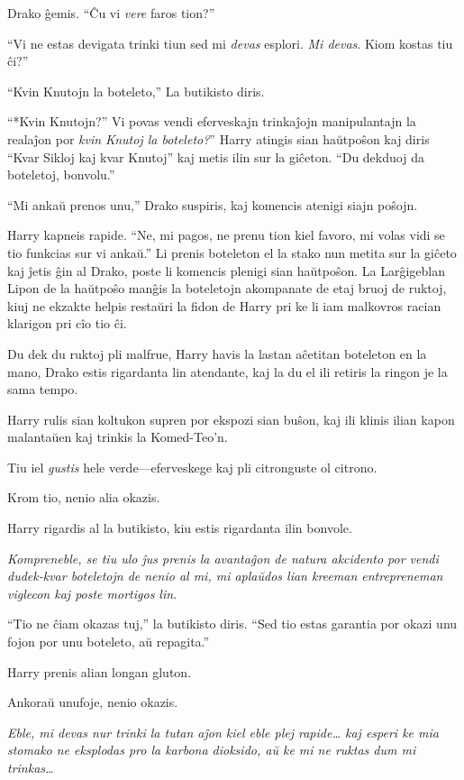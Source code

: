 Drako ĝemis. ``Ĉu vi \emph{vere} faros tion?''

``Vi ne estas devigata trinki tiun sed mi \emph{devas}
esplori. \emph{Mi devas}. Kiom kostas tiu ĉi?''

``Kvin Knutojn la boteleto,'' La butikisto diris.

``*Kvin Knutojn?'' Vi povas vendi eferveskajn trinkaĵojn manipulantajn la
realaĵon por \emph{kvin Knutoj la boteleto?}'' Harry atingis sian
haŭtpoŝon kaj diris ``Kvar Sikloj kaj kvar Knutoj'' kaj metis ilin sur la
giĉeton. ``Du dekduoj da boteletoj, bonvolu.'' 

``Mi ankaŭ prenos unu,'' Drako suspiris, kaj komencis atenigi siajn
poŝojn.

Harry kapneis rapide. ``Ne, mi pagos, ne prenu tion kiel favoro, mi
volas vidi se tio funkcias sur vi ankaŭ.''  Li prenis boteleton el la
stako nun metita sur la giĉeto kaj ĵetis ĝin al Drako, poste li
komencis plenigi sian haŭtpoŝon. La Larĝigeblan Lipon de la haŭtpoŝo
manĝis la boteletojn akompanate de etaj bruoj de ruktoj, kiuj ne
ekzakte helpis restaŭri la fidon de Harry pri ke li iam malkovros
racian klarigon pri cîo tio ĉi.

Du dek du ruktoj pli malfrue, Harry havis la lastan aĉetitan boteleton
en la mano, Drako estis rigardanta lin atendante, kaj la du el ili
retiris la ringon je la sama tempo.

Harry rulis sian koltukon supren por ekspozi sian buŝon, kaj ili klinis
ilian kapon malantaŭen kaj trinkis la Komed-Teo'n.

Tiu iel \emph{gustis} hele verde—eferveskege kaj pli citronguste ol
citrono.

Krom tio, nenio alia okazis.

Harry rigardis al la butikisto, kiu estis rigardanta ilin bonvole.

\emph{Kompreneble, se tiu ulo ĵus prenis la avantaĝon de natura
akcidento por vendi dudek-kvar boteletojn de nenio al mi, mi
aplaŭdos lian kreeman entrepreneman viglecon kaj poste mortigos lin.}

``Tio ne ĉiam okazas tuj,'' la butikisto diris. ``Sed tio estas
garantia por okazi unu fojon por unu boteleto, aŭ repagita.''

Harry prenis alian longan gluton.

Ankoraŭ unufoje, nenio okazis.

\emph{Eble, mi devas nur trinki la tutan aĵon kiel eble plej rapide\ldots
kaj esperi ke mia stomako ne eksplodas pro la karbona dioksido, aŭ
ke mi ne ruktas dum mi trinkas\ldots}

